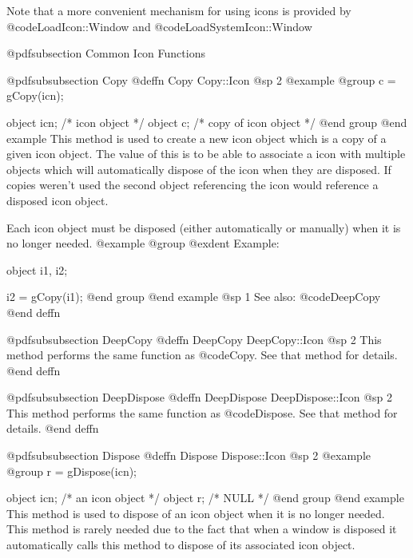 Note that a more convenient mechanism for using icons is provided by
@code{LoadIcon::Window} and @code{LoadSystemIcon::Window}






@pdfsubsection {Common Icon Functions}



@pdfsubsubsection {Copy}
@deffn {Copy} Copy::Icon
@sp 2
@example
@group
c = gCopy(icn);

object  icn;    /*  icon object          */
object  c;      /*  copy of icon object  */
@end group
@end example
This method is used to create a new icon object which is a copy of a
given icon object.  The value of this is to be able to associate a
icon with multiple objects which will automatically dispose of the
icon when they are disposed.  If copies weren't used the second object
referencing the icon would reference a disposed icon object.

Each icon object must be disposed (either automatically or manually)
when it is no longer needed.
@example
@group
@exdent Example:

object  i1, i2;

i2 = gCopy(i1);
@end group
@end example
@sp 1
See also:  @code{DeepCopy}
@end deffn










@pdfsubsubsection {DeepCopy}
@deffn {DeepCopy} DeepCopy::Icon
@sp 2
This method performs the same function as @code{Copy}.  See that
method for details.
@end deffn










@pdfsubsubsection {DeepDispose}
@deffn {DeepDispose} DeepDispose::Icon
@sp 2
This method performs the same function as @code{Dispose}.  See that
method for details.
@end deffn







@pdfsubsubsection {Dispose}
@deffn {Dispose} Dispose::Icon
@sp 2
@example
@group
r = gDispose(icn);

object  icn;   /*  an icon object  */
object  r;     /*  NULL            */
@end group
@end example
This method is used to dispose of an icon object when it is no longer
needed.  This method is rarely needed due to the fact that when a window
is disposed it automatically calls this method to dispose of its
associated icon object.

